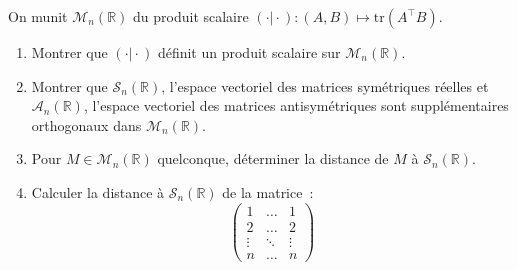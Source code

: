 \documentclass[11pt]{article}
\newcommand{\R}{\mathbb{R}}
\begin{document}
On munit $\mathcal{M}_n(\R)$ du produit scalaire $(\cdot \vert \cdot) : (A,B) \mapsto \mathrm{tr}(A^\top B)$.
\begin{enumerate}[label=\textbf{\arabic*.}]
    \item Montrer que $(\cdot \vert \cdot)$ définit un produit scalaire sur $\mathcal{M}_n(\R)$.
    \item Montrer que $\mathcal{S}_n(\R)$, l'espace vectoriel des matrices symétriques réelles et $\mathcal{A}_n(\R)$, l'espace vectoriel des matrices antisymétriques sont supplémentaires orthogonaux dans $\mathcal{M}_n(\R)$.
    \item Pour $M \in \mathcal{M}_n(\R)$ quelconque, déterminer la distance de $M$ à $\mathcal{S}_n(\R)$.
    \item Calculer la distance à $\mathcal{S}_n(\R)$ de la matrice~:
    $$\begin{pmatrix}
        1&\dots&1\\
        2&\dots&2\\
        \vdots&\ddots&\vdots\\
        n&\dots&n
    \end{pmatrix}$$
\end{enumerate}
\end{document}
